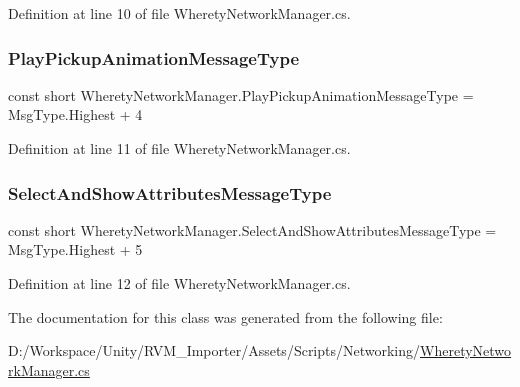 Definition at line 10 of file Wherety\+Network\+Manager.\+cs.

\mbox{\label{class_wherety_network_manager_ae3eb8fd7f71b5d2c6f6bf0189f3deff3}} 
\subsubsection{\texorpdfstring{PlayPickupAnimationMessageType}{PlayPickupAnimationMessageType}}
{\footnotesize\ttfamily const short Wherety\+Network\+Manager.\+Play\+Pickup\+Animation\+Message\+Type = Msg\+Type.\+Highest + 4}



Definition at line 11 of file Wherety\+Network\+Manager.\+cs.

\mbox{\label{class_wherety_network_manager_a434267823b738ab40c2e56cea748c401}} 
\subsubsection{\texorpdfstring{SelectAndShowAttributesMessageType}{SelectAndShowAttributesMessageType}}
{\footnotesize\ttfamily const short Wherety\+Network\+Manager.\+Select\+And\+Show\+Attributes\+Message\+Type = Msg\+Type.\+Highest + 5}



Definition at line 12 of file Wherety\+Network\+Manager.\+cs.



The documentation for this class was generated from the following file\+:\begin{DoxyCompactItemize}
\item 
D\+:/\+Workspace/\+Unity/\+R\+V\+M\+\_\+\+Importer/\+Assets/\+Scripts/\+Networking/\mbox{\hyperlink{_wherety_network_manager_8cs}{Wherety\+Network\+Manager.\+cs}}\end{DoxyCompactItemize}
